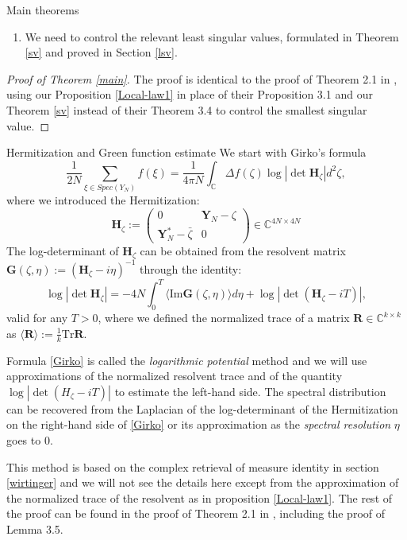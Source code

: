 \documentclass[11pt, a4paper, oneside]{book}
\numberwithin{equation}{chapter}
\newcommand{\beq}{\begin{equation}}
\newcommand{\eeq}{\end{equation}}
\begin{document}
\begin{section}{Main theorems}
\begin{enumerate}
%
\item We need to control the relevant least singular values, formulated in Theorem \ref{sv} and proved in Section \ref{lsv}.
%
\end{enumerate}
%
\begin{proof}[Proof of Theorem \ref{main}]
The proof is identical to the proof of Theorem 2.1 in \cite{alt2022local}, using our Proposition \ref{Local-law1} in place of their Proposition 3.1 and our Theorem \ref{sv} instead of their Theorem 3.4 to control the smallest singular value.
\end{proof}
%
\end{section}
%
\begin{section}{Hermitization and Green function estimate}
%
We start with Girko's formula
%
\beq \label{Girko}
\frac{1}{2N} \sum \limits_{\xi \in Spec (Y_N)} f(\xi) = \frac{1}{4\pi N} \int_{\mathbb{C}} \Delta f( \zeta ) \log | \det \mathbf{H}_\zeta | d^2 \zeta,
\eeq
%
where we introduced the Hermitization:
%
\beq \label{Herm}
\mathbf{H}_\zeta := \begin{pmatrix} 0 & \mathbf{Y}_N - \zeta \\ \mathbf{Y}_N^* - \bar{\zeta} & 0 \end{pmatrix}
\in \mathbb{C}^{4N \times 4N} \eeq
%
The log-determinant of $\mathbf{H}_{\zeta}$ can be obtained from the resolvent matrix $\mathbf{G}(\zeta,\eta):= (\mathbf{H}_{\zeta}-i \eta)^{-1} $ through the identity:
%
\beq \label{log-det}
\log | \det \mathbf{H}_{\zeta} | = -4N \int_{0}^T \langle \mathrm{Im} \mathbf{G}(\zeta,\eta) \rangle d\eta + \log | \det(\mathbf{H}_{\zeta}-iT) |,
\eeq
%
valid for any $T>0$, where we defined the normalized trace of a matrix $\mathbf{R} \in \mathbb{C}^{k \times k}$ as $\langle \mathbf{R} \rangle := \frac{1}{k} \mathrm{Tr} \mathbf{R}.$

Formula \eqref{Girko} is called the \textit{logarithmic potential} method and we will use approximations of the normalized resolvent trace and of the quantity $\log | \det(H_{\zeta}-iT) |$ to estimate the left-hand side. The spectral distribution can be recovered from the Laplacian of the log-determinant of the Hermitization on the right-hand side of \eqref{Girko} or its approximation as the \textit{spectral resolution} $\eta$ goes to $0$. 

This method is based on the complex retrieval of measure identity in section \ref{wirtinger} and we will not see the details here except from the approximation of the normalized trace of the resolvent as in proposition \ref{Local-law1}. The rest of the proof can be found in the proof of Theorem 2.1 in \cite{alt2022local}, including the proof of Lemma 3.5.
%
%
\end{section}
\end{document}
